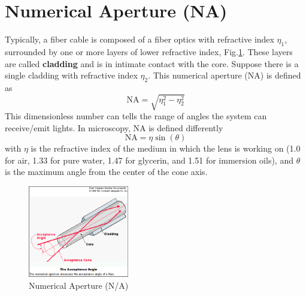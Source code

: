 
% 
% 
% 	
\section{Numerical Aperture (NA)}
\label{sec:numerical_aperture}

Typically, a fiber cable is composed of a fiber optics with refractive index
$\eta_1$, surrounded by one or more layers of lower refractive index,
Fig.\ref{fig:numerical_aperture}.
These layers are called {\bf cladding} and is in intimate contact with the core.
Suppose there is a single cladding with refractive index $\eta_2$. This
numerical aperture (NA) is defined as
\begin{equation}
\text{NA} = \sqrt{\eta_1^2 - \eta_2^2}
\end{equation}
This dimensionless number can tells the range of angles the system can
receive/emit lights. In microscopy, NA is defined differently
\begin{equation}
\text{NA} = \eta \sin(\theta)
\end{equation}
with $\eta$ is the refractive index of the medium in which the lens is working
on (1.0 for air, 1.33 for pure water, 1.47 for glycerin, and 1.51 for immersion
oils), and $\theta$ is the maximum angle from the center of the cone axis. 

\begin{figure}[hbt]
  \centerline{\includegraphics[height=4cm,
    angle=0]{./images/numerical_aperture.eps}}    
\caption{Numerical Aperture (N/A)}
\label{fig:numerical_aperture}
\end{figure}

